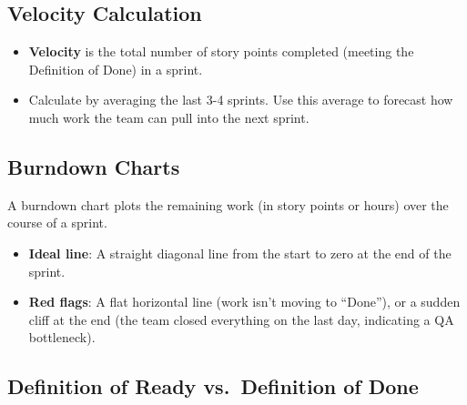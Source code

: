 \documentclass[
  11pt,
  openany,
  oneside]{book}
\providecommand{\tightlist}{%
  \setlength{\itemsep}{0pt}\setlength{\parskip}{0pt}}
\begin{document}
\subsection{Velocity Calculation}\label{velocity-calculation}

\begin{itemize}
\tightlist
\item
  \textbf{Velocity} is the total number of story points completed
  (meeting the Definition of Done) in a sprint.
\item
  Calculate by averaging the last 3-4 sprints. Use this average to
  forecast how much work the team can pull into the next sprint.
\end{itemize}

\subsection{Burndown Charts}\label{burndown-charts}

A burndown chart plots the remaining work (in story points or hours)
over the course of a sprint.

\begin{itemize}
\tightlist
\item
  \textbf{Ideal line}: A straight diagonal line from the start to zero
  at the end of the sprint.
\item
  \textbf{Red flags}: A flat horizontal line (work isn't moving to
  ``Done''), or a sudden cliff at the end (the team closed everything on
  the last day, indicating a QA bottleneck).
\end{itemize}

\subsection{Definition of Ready vs.~Definition of
Done}\label{definition-of-ready-vs.-definition-of-done}
\end{document}
